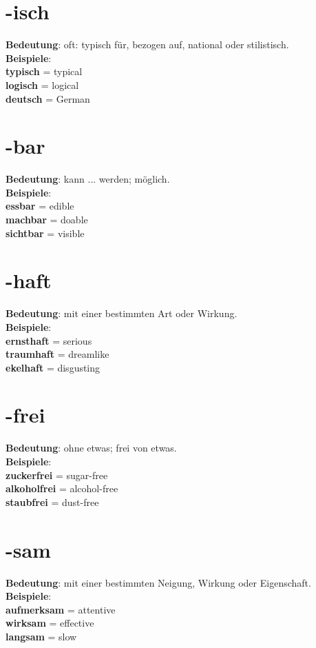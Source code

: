 \documentclass[a4paper]{article}
\begin{document}
    
    \section{-isch}
        \textbf{Bedeutung}: oft: typisch f\"ur, bezogen auf, national oder stilistisch.\\
        \textbf{Beispiele}:\\
        \textbf{typisch} = typical\\
        \textbf{logisch} = logical\\
        \textbf{deutsch} = German\\
    
    
    \section{-bar}
        \textbf{Bedeutung}: kann ... werden; m\"oglich.\\
        \textbf{Beispiele}:\\
        \textbf{essbar} = edible\\
        \textbf{machbar} = doable\\
        \textbf{sichtbar} = visible\\
    
    
    \section{-haft}
        \textbf{Bedeutung}: mit einer bestimmten Art oder Wirkung.\\
        \textbf{Beispiele}:\\
        \textbf{ernsthaft} = serious\\
        \textbf{traumhaft} = dreamlike\\
        \textbf{ekelhaft} = disgusting\\
    
    
    \section{-frei}
        \textbf{Bedeutung}: ohne etwas; frei von etwas.\\
        \textbf{Beispiele}:\\
        \textbf{zuckerfrei} = sugar-free\\
        \textbf{alkoholfrei} = alcohol-free\\
        \textbf{staubfrei} = dust-free\\
    
    
    \section{-sam}
        \textbf{Bedeutung}: mit einer bestimmten Neigung, Wirkung oder Eigenschaft.\\
        \textbf{Beispiele}:\\
        \textbf{aufmerksam} = attentive\\
        \textbf{wirksam} = effective\\
        \textbf{langsam} = slow\\
    
\end{document}
